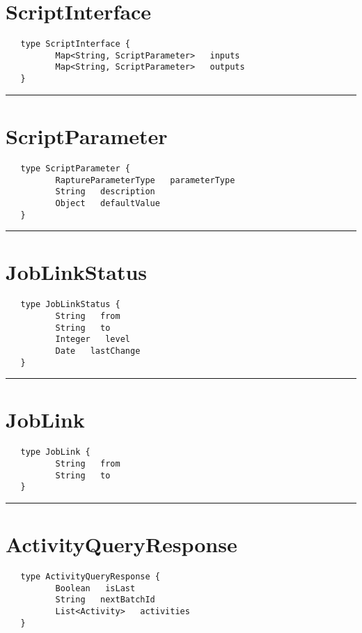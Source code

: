 \section{ScriptInterface}
\label{type:ScriptInterface}

\begin{Verbatim}
   type ScriptInterface {
          Map<String, ScriptParameter>   inputs
          Map<String, ScriptParameter>   outputs
   }
\end{Verbatim}

\rule{12cm}{2pt}
\section{ScriptParameter}
\label{type:ScriptParameter}

\begin{Verbatim}
   type ScriptParameter {
          RaptureParameterType   parameterType
          String   description
          Object   defaultValue
   }
\end{Verbatim}

\rule{12cm}{2pt}
\section{JobLinkStatus}
\label{type:JobLinkStatus}

\begin{Verbatim}
   type JobLinkStatus {
          String   from
          String   to
          Integer   level
          Date   lastChange
   }
\end{Verbatim}

\rule{12cm}{2pt}
\section{JobLink}
\label{type:JobLink}

\begin{Verbatim}
   type JobLink {
          String   from
          String   to
   }
\end{Verbatim}

\rule{12cm}{2pt}
\section{ActivityQueryResponse}
\label{type:ActivityQueryResponse}

\begin{Verbatim}
   type ActivityQueryResponse {
          Boolean   isLast
          String   nextBatchId
          List<Activity>   activities
   }
\end{Verbatim}

